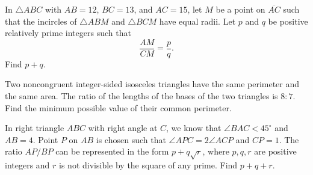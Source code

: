 \documentclass[11pt]{article}
\theoremstyle{definition}
\begin{document}
%	












\begin{question}[name={2010 AIME I, \href{https://artofproblemsolving.com/community/c4p1813787}{Problem 15}}]
	In $ \triangle{ABC}$ with $ AB = 12$, $ BC = 13$, and $ AC = 15$, let $ M$ be a point on $ \overline{AC}$ such that the incircles of $ \triangle{ABM}$ and $ \triangle{BCM}$ have equal radii. Let $ p$ and $ q$ be positive relatively prime integers such that $$ \frac{AM}{CM} = \frac{p}{q}.$$ Find $p + q$.
\end{question}


%	












\begin{question}[name={2010 AIME II, \href{https://artofproblemsolving.com/community/c4p1832362}{Problem 12}}]
	Two noncongruent integer-sided isosceles triangles have the same perimeter and the same area. The ratio of the lengths of the bases of the two triangles is $ 8: 7$. Find the minimum possible value of their common perimeter.
	
\end{question}


%	












\begin{question}[name={2010 AIME II, \href{https://artofproblemsolving.com/community/c4p1831370}{Problem 14}}]
	In right triangle $ ABC$ with right angle at $ C$, we know that $ \angle BAC < 45^{\circ}$ and $ AB = 4$. Point $ P$ on $ AB$ is chosen such that $ \angle APC = 2\angle ACP$ and $ CP = 1$. The ratio ${AP}/{BP}$ can be represented in the form $ p + q\sqrt{r}$, where $ p,q,r$ are positive integers and $ r$ is not divisible by the square of any prime. Find $p+q+r$.
\end{question}
\end{document}
